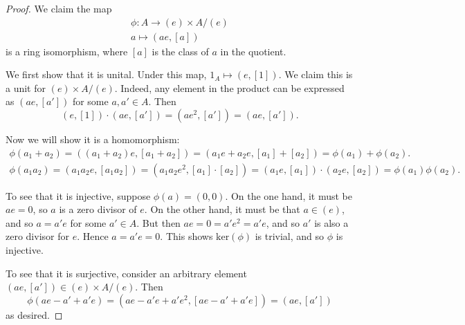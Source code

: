 \documentclass[12pt]{article}
\begin{document}
\begin{proof}
	We claim the map
	\begin{gather*}
		\phi: A \longrightarrow (e) \times A/(e) \\
		a \mapsto (ae, [a])
	\end{gather*}
	is a ring isomorphism, where $[a]$ is the class of $a$ in the quotient.

	We first show that it is unital. Under this map, $1_A \mapsto (e, [1])$. We claim this is a unit for $(e)\times A/(e)$. Indeed, any element in the product can be expressed as $(ae, [a'])$ for some $a,a'\in A$. Then
	\begin{equation*}
		(e, [1]) \cdot (ae, [a']) = (ae^2, [a']) = (ae, [a']).
	\end{equation*}

	Now we will show it is a homomorphism:
	\begin{gather*}
		\phi(a_1 + a_2) = ((a_1+a_2)e, [a_1 + a_2]) = (a_1e + a_2e, [a_1] + [a_2]) = \phi(a_1) + \phi(a_2). \\
		\phi(a_1a_2) = (a_1a_2e, [a_1a_2]) = (a_1a_2e^2, [a_1]\cdot [a_2]) = (a_1e, [a_1])\cdot (a_2e, [a_2]) = \phi(a_1)\phi(a_2).
	\end{gather*}

	To see that it is injective, suppose $\phi(a)=(0,0)$. On the one hand, it must be $ae=0$, so $a$ is a zero divisor of $e$. On the other hand, it must be that $a\in (e)$, and so $a=a'e$ for some $a'\in A$. But then $ae=0=a'e^2=a'e$, and so $a'$ is also a zero divisor for $e$. Hence $a=a'e=0$. This shows $\text{ker}(\phi)$ is trivial, and so $\phi$ is injective.

	To see that it is surjective, consider an arbitrary element $(ae, [a'])\in (e)\times A/(e)$. Then 
	\begin{equation*}
		\phi(ae - a' + a'e) = (ae - a'e + a'e^2, [ae - a' + a'e]) = (ae, [a'])
	\end{equation*}
	as desired.
\end{proof}
\end{document}
